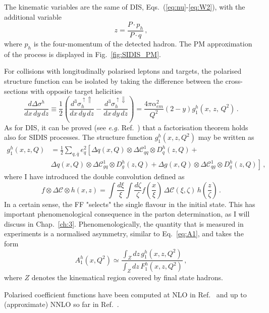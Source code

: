 The kinematic variables are the same of DIS, Eqs.~(\ref{eq:nu}-\ref{eq:W2}), with the additional variable
\begin{equation}
  z = \frac{P \cdot p_h}{P \cdot q} \,,
\end{equation}
where $p_h$ is the four-momentum of the detected hadron. The PM approximation of the process is displayed in Fig.~\ref{fig:SIDIS_PM}.\par
For collisions with longitudinally polarised leptons and targets, the polarised structure function can be isolated by taking the difference between the cross-sections with opposite target helicities \cite{Abele:2021nyo}
\begin{equation}
  \frac{d \Delta \sigma^h}{dx \, dy \, dz} \equiv  \frac{1}{2} \left(\frac{d^3\sigma_{h}^{\uparrow \Uparrow}}{dx\,dy\,dz} - \frac{d^3\sigma_{h}^{\uparrow \Downarrow}}{dx\,dy\,dz}\right) = \frac{4\pi \alpha_{em}^2}{Q^2} (2-y) g_{1}^{h} (x,\,z,\,Q^2)\,.
\end{equation}
As for DIS, it can be proved (see \textit{e.g.} Ref.~\cite{collins_2011}) that a factorisation theorem holds also for SIDIS processes. The structure function $g_1^h (x,z,Q^2)$ may be written as
\begin{equation}
  \begin{split}
    g_1^{h} (x,z,Q) & = \frac{1}{2} \sum_{q,\bar{q}} e_{q}^2 \left[ \Delta q(x,Q) \otimes \Delta \mathcal{C}_{qq}^{1} \otimes D_{q}^{h}(z,Q) + \right.\\
    & \left.\Delta q(x,Q) \otimes \Delta \mathcal{C}_{gq}^{1} \otimes D^{h}_{g}(z,Q) + \Delta g(x,Q) \otimes \Delta \mathcal{C}_{qg}^{1} \otimes D^{h}_{q}(z,Q) \right] \,,
    \end{split}
    \label{eq:g1h}
\end{equation}
where I have introduced the double convolution defined as 
\begin{equation}
  f \otimes \Delta \mathcal{C} \otimes h (x,z) = \int \frac{d\xi}{\xi} \int \frac{d \zeta} {\zeta} f \left( \frac{x}{\xi}\right)  \, \Delta \mathcal{C} \left(\xi, \zeta\right) \, h \left( \frac{z}{\zeta} \right) \,.
\end{equation}
In a certain sense, the FF "selects" the single flavour in the initial state. This has important phenomenological consequence in the parton determination, as I will discuss in Chap.~\ref*{ch:3}. Phenomenologically, the quantity that is measured in experiments is a normalised asymmetry, similar to Eq.~\eqref{eq:A1}, and takes the form~\cite{deFlorian:2000bm}
\begin{equation}
  A_1^{h}(x,Q^2) \simeq  \frac{\int_{Z} dz \, g_1^h (x,z,Q^2)}{\int_{Z} dz \, F_1^h (x,z,Q^2)} \,,
\end{equation}
where $Z$ denotes the kinematical region covered by final state hadrons.\par
Polarised coefficient functions have been computed at NLO in Ref.~\cite{deFlorian:1997zj} and up to (approximate) NNLO so far in Ref.~\cite{Abele:2021nyo}.%


